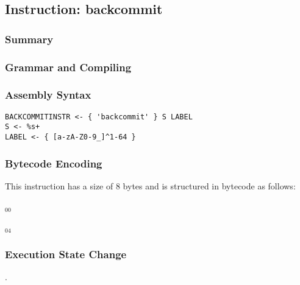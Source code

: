 \subsection{Instruction: backcommit}

\subsubsection{Summary}


\subsubsection{Grammar and Compiling}


\subsubsection{Assembly Syntax}

\begin{myquote}
\begin{verbatim}
BACKCOMMITINSTR <- { 'backcommit' } S LABEL
S <- %s+
LABEL <- { [a-zA-Z0-9_]^1-64 }
\end{verbatim}
\end{myquote}

\subsubsection{Bytecode Encoding}

This instruction has a size of 8 bytes and is structured in bytecode as follows:

$_{00}$\ 



$_{04}$\ 


\subsubsection{Execution State Change}

.


